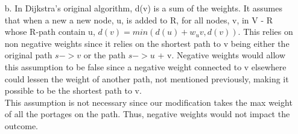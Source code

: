 \documentclass[12pt]{article}
\begin{document}
\begin{enumerate}
    \item[b.] In Dijkstra’s original algorithm, d(v) is a sum of the weights. It assumes that when a new 
    a new node, u, is added to R, for all nodes, v, in  V - R whose R-path contain u, 
    $d(v) = min(d(u) + w_uv, d(v))$. This relies on non negative weights since it relies on the shortest path
    to v being either the original path $s-> v$ or the path  $s->u$ + v. Negative weights would allow this 
    assumption to be false since a negative weight connected to v elsewhere could lessen the weight of another
    path, not mentioned previously, making it possible to be the shortest path to v.\\

    This assumption is not necessary since our modification takes the max weight of all the portages on the path.
    Thus, negative weights would not impact the outcome.\\
\end{enumerate}
\newpage
\end{document}
